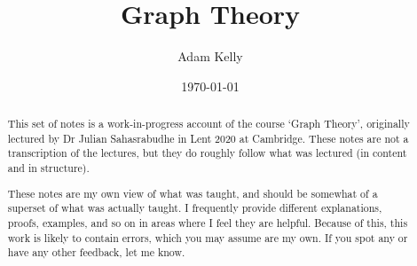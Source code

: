 \documentclass[a4paper]{scrreprt}
\title{Graph Theory}
\author{Adam Kelly}
\date{\today}
\begin{document}
\maketitle

\begin{abstract}
	

	This set of notes is a work-in-progress account of the course `Graph Theory', originally lectured by Dr Julian Sahasrabudhe in Lent 2020 at Cambridge. These notes are not a transcription of the lectures, but they do roughly follow what was lectured (in content and in structure).

	These notes are my own view of what was taught, and should be somewhat of a superset of what was actually taught. I frequently provide different explanations, proofs, examples, and so on in areas where I feel they are helpful. Because of this, this work is likely to contain errors, which you may assume are my own. If you spot any or have any other feedback, let me know.



\end{abstract}

\tableofcontents




\end{document}
